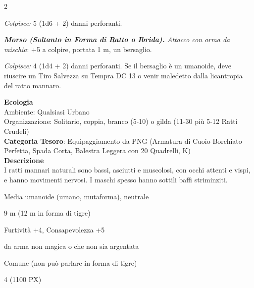 \begin{multicols}{2}
{\emph{Colpisce:} 5 (1d6 + 2) danni perforanti.

\emph{\textbf{Morso (Soltanto in Forma di Ratto o Ibrida).} Attacco con arma da mischia}: +5 a colpire, portata 1 m, un bersaglio.

\emph{Colpisce:} 4 (1d4 + 2) danni perforanti. Se il bersaglio è un umanoide, deve riuscire un Tiro Salvezza su Tempra DC 13 o venir maledetto dalla licantropia del ratto mannaro.

\textbf{Ecologia}\\
Ambiente: Qualsiasi Urbano\\
Organizzazione: Solitario, coppia, branco (5-10) o gilda (11-30 più 5-12 Ratti Crudeli)\\
\textbf{Categoria Tesoro}: Equipaggiamento da PNG (Armatura di Cuoio Borchiato Perfetta, Spada Corta, Balestra Leggera con 20 Quadrelli, K)\\
\textbf{Descrizione}\\
I ratti mannari naturali sono bassi, asciutti e muscolosi, con occhi attenti e vispi, e hanno movimenti nervosi. I maschi spesso hanno sottili baffi striminziti.

\begin{description}[noitemsep, topsep=0pt, parsep=0pt, partopsep=0pt, itemsep=1pt, leftmargin=2.35cm,  labelwidth=2.2cm, itemindent=0cm, listparindent=0pt] %
\setlength{\baselineskip}{10pt}
\item[\textbf{Taglia/Tipo}] Media umanoide (umano, mutaforma), neutrale
\item[\textbf{Caratt.}] 
\item[\textbf{Punti Ferita}] 
\item[\textbf{Movimento}] 9 m (12 m in forma di tigre)
\item[\textbf{Tiri Salvez.}] 
\item[\textbf{Comp.}] Furtività +4, Consapevolezza +5
\item[\textbf{Imm. Danni}] da arma non magica o che non sia argentata
\item[\textbf{Sensi}] 
\item[\textbf{Linguaggi}] Comune (non può parlare in forma di tigre)
\item[\textbf{Sfida}] 4 (1100 PX)
\end{description}
\smallskip

}
\end{multicols}
